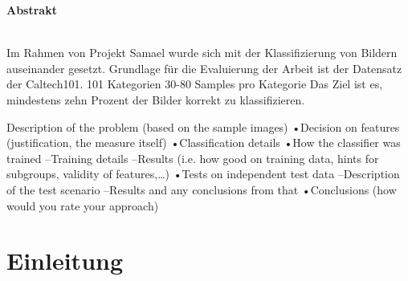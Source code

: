 \documentclass[liststotoc,11pt,a4paper]{article}
\begin{document}
\thispagestyle{empty}
\newpage
\setcounter{page}{1}
\tableofcontents                %
\newpage


\Large \bfseries Abstrakt\\
\normalsize \mdseries
{}
\\Im Rahmen von Projekt Samael wurde sich mit der Klassifizierung von Bildern auseinander gesetzt. Grundlage für die Evaluierung der Arbeit ist der Datensatz der Caltech101. 
101 Kategorien
30-80 Samples pro Kategorie
Das Ziel ist es, mindestens zehn Prozent der Bilder korrekt zu klassifizieren.


Description of the problem (based on the sample images)
•Decision on features (justification, the measure itself)
•Classification details
•How the classifier was trained
–Training details
–Results (i.e. how good on training data, hints for subgroups, validity of features,…)
•Tests on independent test data
–Description of the test scenario
–Results and any conclusions from that
•Conclusions (how would you rate your approach)
\section{Einleitung}
\label{firstSec}

\newline 
\normalfont

\newpage
{}	%
\setcounter{page}{6}
\renewcommand{\refname}{Referenzen}


\end{document}
